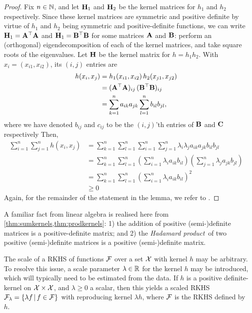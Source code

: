 \begin{proof}
  Fix $n\in\mathbb{N}$, and let ${\mathbf H}_1$ and ${\mathbf H}_2$ be the kernel matrices for $h_1$ and $h_2$ respectively.
  Since these kernel matrices are symmetric and positive definite by virtue of $h_1$ and $h_2$ being symmetric and positive-definite functions, we can write ${\mathbf H}_1 = {\mathbf A}^\top{\mathbf A}$ and ${\mathbf H}_1 = {\mathbf B}^\top{\mathbf B}$ for some matrices ${\mathbf A}$ and ${\mathbf B}$: perform an (orthogonal) eigendecomposition of each of the kernel matrices, and take square roots of the eigenvalues.
  Let ${\mathbf H}$ be the kernel matrix for $h = h_1h_2$.
  With $x_i = (x_{i1}, x_{i2})$, its $(i,j)$ entries are
  \begin{align*}
    h(x_i,x_j)
    &= h_1(x_{i1},x_{i2}) \, h_2(x_{j1},x_{j2}) \\
    &= ({\mathbf A}^\top{\mathbf A})_{ij} \, ({\mathbf B}^\top{\mathbf B})_{ij} \\
    &= \sum_{k=1}^n a_{ik}a_{jk} \sum_{l=1}^n b_{il}b_{jl},
  \end{align*}
  where we have denoted $b_{ij}$ and $c_{ij}$ to be the $(i,j)$'th entries of ${\mathbf B}$ and ${\mathbf C}$ respectively 
  Then,
  \begin{align*}
    \sum_{i=1}^n\sum_{j=1}^n h(x_i,x_j)
    &= \sum_{k=1}^n \sum_{l=1}^n \sum_{i=1}^n \sum_{j=1}^n  \lambda_i \lambda_j a_{ik}a_{jk}b_{il}b_{jl} \\
    &= \sum_{k=1}^n \sum_{l=1}^n \left(\sum_{i=1}^n \lambda_i a_{ik} b_{il} \right) \left( \sum_{j=1}^n  \lambda_j a_{jk}b_{jl} \right) \\
    &= \sum_{k=1}^n \sum_{l=1}^n \left(\sum_{i=1}^n \lambda_i a_{ik} b_{il} \right)^2 \\
    &\geq 0
  \end{align*}
  Again, for the remainder of the statement in the lemma, we refer to \citet[Theorem 13]{berlinet2011reproducing}.
\end{proof}

A familiar fact from linear algebra is realised here from \cref{thm:sumkernels,thm:prodkernels}: 
1) the addition of positive (semi-)definite matrices is a positive-definite matrix; and 
2) the \emph{Hadamard product}\footnotemark~of two positive (semi-)definite matrices is a positive (semi-)definite matrix.

The scale of a RKHS of functions ${\mathcal F}$ over a set ${\mathcal X}$ with kernel $h$ may be arbitrary.
To resolve this issue, a scale parameter $\lambda\in\mathbb{R}$ for the kernel $h$ may be introduced, which will typically need to be estimated from the data. 
If $h$ is a positive definite-kernel on ${\mathcal X}\times{\mathcal X}$, and $\lambda \geq 0$ a scalar, then this yields a scaled RKHS ${\mathcal F}_\lambda = \{\lambda f \,|\, f \in {\mathcal F} \}$ with reproducing kernel $\lambda h$, where ${\mathcal F}$ is the RKHS defined by $h$.

